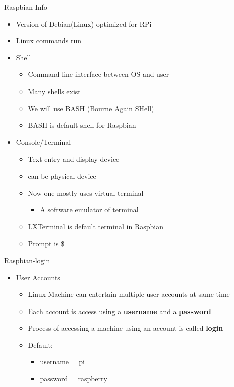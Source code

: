 \begin{frame}{Raspbian-Info}
	\begin{itemize}
		\item Version of Debian(Linux) optimized for RPi
		\item Linux commands run
		\item Shell
		\begin{itemize}
			\item Command line interface between OS and user
			\item Many shells exist
			\item We will use BASH (Bourne Again SHell)
			\item BASH is default shell for Raspbian
		\end{itemize}
		\item Console/Terminal
		\begin{itemize}
			\item Text entry and display device
			\item can be physical device
			\item Now one mostly uses virtual terminal
			\begin{itemize}
				\item A software emulator of terminal
			\end{itemize}
			\item LXTerminal is default terminal in Raspbian
			\item Prompt is \$
		\end{itemize}
	\end{itemize}
\end{frame}

\begin{frame}{Raspbian-login}
	\begin{itemize}
		\item User Accounts
		\begin{itemize}
			\item Linux Machine can entertain multiple user accounts at same time
			\item Each account is access using a \textbf{username} and a \textbf{password}
			\item Process of accessing a machine using an account is called \textbf{login}
			\item Default:
			\begin{itemize}
				\item username = pi
				\item password = raspberry
			\end{itemize}
		\end{itemize}
	\end{itemize}
\end{frame}

